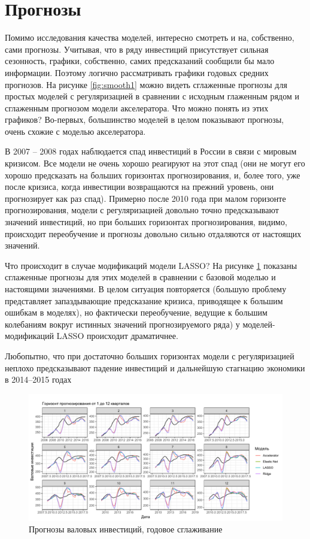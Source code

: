 \section{Прогнозы}
Помимо исследования качества моделей, интересно смотреть и на, собственно, сами прогнозы. Учитывая, что в ряду инвестиций присутствует сильная сезонность, графики, собственно, самих предсказаний сообщили бы мало информации. Поэтому логично рассматривать графики годовых средних прогнозов. На рисунке \ref{fig:smooth1} можно видеть сглаженные прогнозы для простых моделей с регуляризацией в сравнении с исходным глаженным рядом и сглаженным прогнозом модели акселератора. Что можно понять из этих графиков? Во-первых, большинство моделей в целом показывают прогнозы, очень схожие с моделью акселератора.

В 2007 -- 2008 годах наблюдается спад инвестиций в России в связи с мировым кризисом. Все модели не очень хорошо реагируют на этот спад (они не могут его хорошо предсказать на больших горизонтах прогнозирования, и, более того, уже после кризиса, когда инвестиции возвращаются на прежний уровень, они прогнозирует как раз спад). Примерно после 2010 года при малом горизонте прогнозирования, модели с регуляризацией довольно точно предсказывают значений инвестиций, но при больших горизонтах прогнозирования, видимо, происходит переобучение и прогнозы довольно сильно отдаляются от настоящих значений.


Что происходит в случае модификаций модели LASSO? На рисунке \ref{fig:smooth2} показаны сглаженные прогнозы для этих моделей в сравнении с базовой моделью и настоящими значениями. В целом ситуация повторяется (большую проблему представляет запаздывающие предсказание кризиса, приводящее к большим ошибкам в моделях), но фактически переобучение, ведущие к большим колебаниям вокруг истинных значений прогнозируемого ряда) у моделей-модификаций LASSO происходит драматичнее.


Любопытно, что при достаточно больших горизонтах модели с регуляризацией неплохо предсказывают падение инвестиций и дальнейшую стагнацию экономики в 2014--2015 годах
\begin{figure}[hp]
    \centering
    \includegraphics[width = \textwidth]{smooth1.pdf}
    \caption{Прогнозы валовых инвестиций, годовое сглаживание}
    \label{fig:smooth2}
\end{figure}

